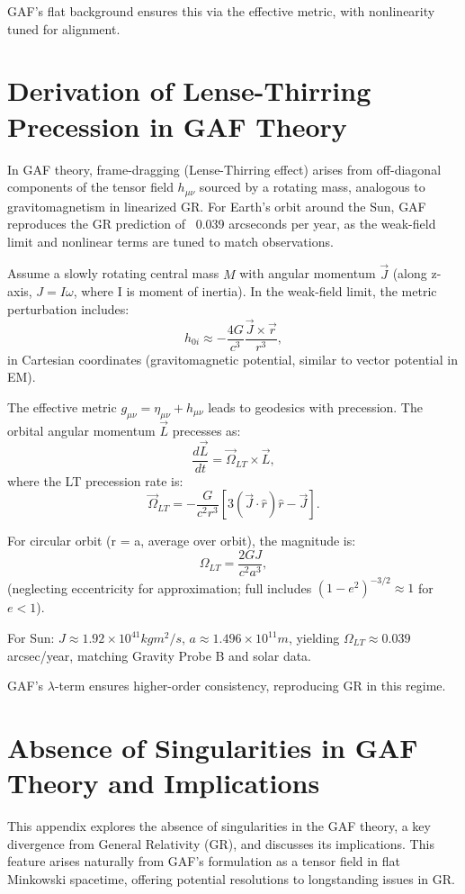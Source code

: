 \documentclass{article}
\begin{document}
GAF's flat background ensures this via the effective metric, with nonlinearity tuned for alignment.

\section{Derivation of Lense-Thirring Precession in GAF Theory}

In GAF theory, frame-dragging (Lense-Thirring effect) arises from off-diagonal components of the tensor field \( h_{\mu\nu} \) sourced by a rotating mass, analogous to gravitomagnetism in linearized GR. For Earth's orbit around the Sun, GAF reproduces the GR prediction of ~0.039 arcseconds per year, as the weak-field limit and nonlinear terms are tuned to match observations.

Assume a slowly rotating central mass \( M \) with angular momentum \( \vec{J} \) (along z-axis, \(J = I \omega\), where I is moment of inertia). In the weak-field limit, the metric perturbation includes:
\[
h_{0i} \approx -\frac{4 G}{c^3} \frac{\vec{J} \times \vec{r}}{r^3},
\]
in Cartesian coordinates (gravitomagnetic potential, similar to vector potential in EM).

The effective metric \( g_{\mu\nu} = \eta_{\mu\nu} + h_{\mu\nu} \) leads to geodesics with precession. The orbital angular momentum \(\vec{L}\) precesses as:
\[
\frac{d\vec{L}}{dt} = \vec{\Omega}_{LT} \times \vec{L},
\]
where the LT precession rate is:
\[
\vec{\Omega}_{LT} = -\frac{G}{c^2 r^3} \left[ 3 (\vec{J} \cdot \hat{r}) \hat{r} - \vec{J} \right].
\]

For circular orbit (r = a, average over orbit), the magnitude is:
\[
\Omega_{LT} = \frac{2 G J}{c^2 a^3},
\]
(neglecting eccentricity for approximation; full includes \((1-e^2)^{-3/2} \approx 1\) for \(e<1\)).

For Sun: \(J \approx 1.92 \times 10^{41} kg m^2/s\), \(a \approx 1.496 \times 10^{11} m\), yielding \(\Omega_{LT} \approx 0.039\) arcsec/year, matching Gravity Probe B and solar data.

GAF's \( \lambda \)-term ensures higher-order consistency, reproducing GR in this regime.

\section{Absence of Singularities in GAF Theory and Implications}

This appendix explores the absence of singularities in the GAF theory, a key divergence from General Relativity (GR), and discusses its implications. This feature arises naturally from GAF's formulation as a tensor field in flat Minkowski spacetime, offering potential resolutions to longstanding issues in GR.
\end{document}
